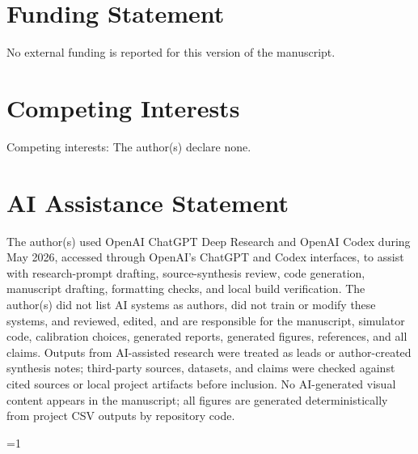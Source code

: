 \documentclass[
    journal=jlc,
    manuscript=research-article,
    year=2026,
  ]{cup-journal}
\def\paperusescup{1}
\def\paperusescup{0}
\begin{document}
\section*{Funding Statement}

No external funding is reported for this version of the manuscript.

\section*{Competing Interests}

Competing interests: The author(s) declare none.

\section*{AI Assistance Statement}

The author(s) used OpenAI ChatGPT Deep Research and OpenAI Codex during May 2026, accessed through OpenAI's ChatGPT and Codex interfaces, to assist with research-prompt drafting, source-synthesis review, code generation, manuscript drafting, formatting checks, and local build verification. The author(s) did not list AI systems as authors, did not train or modify these systems, and reviewed, edited, and are responsible for the manuscript, simulator code, calibration choices, generated reports, generated figures, references, and all claims. Outputs from AI-assisted research were treated as leads or author-created synthesis notes; third-party sources, datasets, and claims were checked against cited sources or local project artifacts before inclusion. No AI-generated visual content appears in the manuscript; all figures are generated deterministically from project CSV outputs by repository code.

\ifnum\paperusescup=1
  \printbibliography
\else
  
  
\fi
\end{document}
